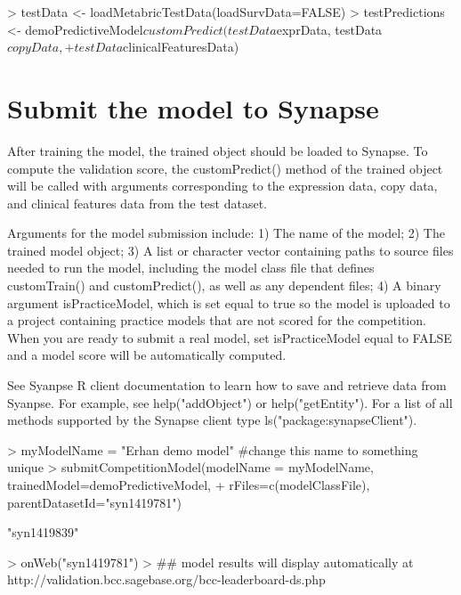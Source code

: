 \documentclass[10pt]{article}
\begin{document}
\begin{Schunk}
\begin{Sinput}
> testData <- loadMetabricTestData(loadSurvData=FALSE)
> testPredictions <- demoPredictiveModel$customPredict(testData$exprData, testData$copyData,
+                                                      testData$clinicalFeaturesData)
\end{Sinput}
\end{Schunk}

\section{Submit the model to Synapse}
After training the model, the trained object should be loaded to Synapse. To compute the validation score, the customPredict() method of the trained object will be called with arguments corresponding to the expression data, copy data, and clinical features data from the test dataset. 

Arguments for the model submission include: 1) The name of the model; 2) The trained model object; 3) A list or character vector containing paths to source files needed to run the model, including the model class file that defines customTrain() and customPredict(), as well as any dependent files; 4) A binary argument isPracticeModel, which is set equal to true so the model is uploaded to a project containing practice models that are not scored for the competition. When you are ready to submit a real model, set isPracticeModel equal to FALSE and a model score will be automatically computed.

See Syanpse R client documentation to learn how to save and retrieve data from Syanpse. For example, see help("addObject") or help("getEntity"). For a list of all methods supported by the Synapse client type ls("package:synapseClient").

\begin{Schunk}
\begin{Sinput}
> myModelName = "Erhan demo model" #change this name to something unique
> submitCompetitionModel(modelName = myModelName, trainedModel=demoPredictiveModel,
+                        rFiles=c(modelClassFile), parentDatasetId="syn1419781")
\end{Sinput}
\begin{Soutput}
[1] "syn1419839"
\end{Soutput}
\begin{Sinput}
> onWeb("syn1419781")
> ## model results will display automatically at http://validation.bcc.sagebase.org/bcc-leaderboard-ds.php
\end{Sinput}
\end{Schunk}
\end{document}
